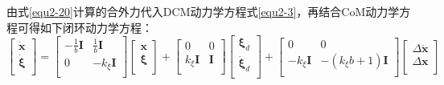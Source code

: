             由式\eqref{equ2-20}计算的合外力代入DCM动力学方程式\eqref{equ2-3}，再结合CoM动力学方程可得如下闭环动力学方程：
            \begin{equation}
                \left[ \begin{array}{c}
                    \boldsymbol{\dot{x}}\\
                    \boldsymbol{\dot{\xi}}\\
                \end{array} \right] =\left[ \begin{matrix}
                    -\frac{1}{b}\boldsymbol{I}&		\frac{1}{b}\boldsymbol{I}\\
                    0&		-k_{\xi}\boldsymbol{I}\\
                \end{matrix} \right] \left[ \begin{array}{c}
                    \boldsymbol{x}\\
                    \boldsymbol{\xi }\\
                \end{array} \right] +\left[ \begin{matrix}
                    0&		0\\
                    k_{\xi}\boldsymbol{I}&		\boldsymbol{I}\\
                \end{matrix} \right] \left[ \begin{array}{c}
                    \boldsymbol{\xi }_d\\
                    \boldsymbol{\dot{\xi}}_d\\
                \end{array} \right] +\left[ \begin{matrix}
                    0&		0\\
                    -k_{\xi}\boldsymbol{I}&		-\left( k_{\xi}b+1 \right) \boldsymbol{I}\\
                \end{matrix} \right] \left[ \begin{array}{c}
                    \varDelta \boldsymbol{\dot{x}}\\
                    \varDelta \boldsymbol{x}\\
                \end{array} \right] 
                \label{equ2-23}
            \end{equation}

